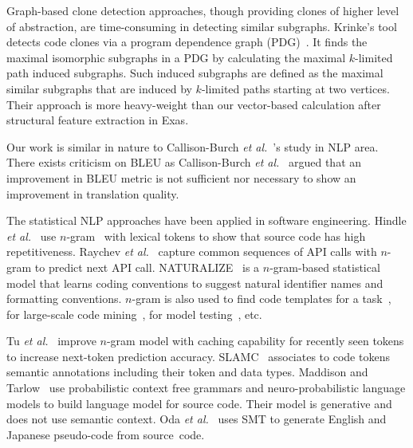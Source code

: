 Graph-based clone detection approaches, though providing clones
of higher level of abstraction, are time-consuming in detecting
similar subgraphs. Krinke's tool detects code clones via a program
dependence graph (PDG)~\cite{krinke01}. It finds the maximal
isomorphic subgraphs in a PDG by calculating the maximal $k$-limited
path induced subgraphs. Such induced subgraphs are defined as the
maximal similar subgraphs that are induced by $k$-limited paths
starting at two vertices. Their approach is more heavy-weight than our
vector-based calculation after structural feature extraction in Exas.




Our work is similar in nature to Callison-Burch {\em et
  al.}~\cite{Callison}'s study in NLP area. There exists criticism on
BLEU as Callison-Burch {\em et al.}~\cite{Callison} argued that an
improvement in BLEU metric is not sufficient nor necessary to show an
improvement in translation quality.


The statistical NLP approaches have been applied in software
engineering. Hindle {\em et al.}~\cite{natural} use
$n$-gram~\cite{manning99} with lexical tokens to show that source code
has high repetitiveness. 
%
Raychev {\em et al.}~\cite{ethz-pldi14} capture common sequences of
API calls with $n$-gram to predict next API call.
NATURALIZE~\cite{barr-codeconvention-fse14} is a $n$-gram-based
statistical model that learns coding conventions to suggest natural
identifier names and formatting conventions.  $n$-gram is also used to
find code templates for a task~\cite{jacob10}, for large-scale
code mining~\cite{sutton-msr13}, for model
testing~\cite{tonella-icse14}, etc.

Tu {\em et al.}~\cite{tu-fse14} improve $n$-gram model with caching
capability for recently seen tokens to increase next-token prediction
accuracy.
%
SLAMC~\cite{fse13} associates to code tokens semantic
annotations including their token and data types.
%
Maddison and Tarlow~\cite{tarlow14} use probabilistic context free
grammars and neuro-probabilistic language models to build language
model for source code. Their model is generative and does not use
semantic context. Oda {\em et al.}~\cite{hide-ase15} uses SMT to
generate English and Japanese pseudo-code from source~code.
